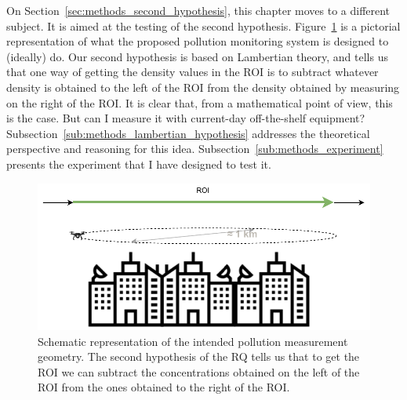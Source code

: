 \FloatBarrier

On Section~\ref{sec:methods_second_hypothesis}, this
chapter moves to a different subject. It is aimed at the testing of the
second hypothesis. Figure~\ref{fig:measuring_over_city} is a pictorial
representation of what the proposed pollution monitoring system is
designed to (ideally) do. Our second hypothesis is based on Lambertian
theory, and tells us that one way of getting the density values in the
\gls{ROI} is to subtract whatever density is obtained to the left of the
\gls{ROI} from the density obtained by measuring on the right of the
\gls{ROI}. It is clear that, from a mathematical point of view, this is
the case. But can I measure it with current-day off-the-shelf equipment?
Subsection~\ref{sub:methods_lambertian_hypothesis} addresses the
theoretical perspective and reasoning for this idea.
Subsection~\ref{sub:methods_experiment} presents the experiment that I
have designed to test it.

\begin{figure}[htpb]
    \centering
    \includegraphics[width=0.8\linewidth]{img/pdf/spectralMeasurementsFromTheSide.pdf}
    \caption{Schematic representation of the intended pollution
    measurement geometry. The second hypothesis of the \gls{RQ} tells us
    that to get the \gls{ROI} we can subtract the concentrations obtained on
    the left of the \gls{ROI} from the ones obtained to the right of the
    \gls{ROI}.}%
    \label{fig:measuring_over_city}
\end{figure}

